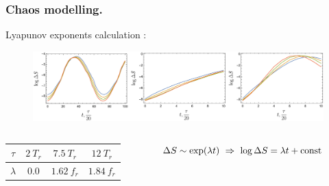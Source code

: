 \begin{frame}
    \frametitle{Chaos modelling.}
    Lyapunov exponents calculation :
    
\begin{figure}[h]
    \includegraphics[width=1.0\textwidth]{figures/lyapunovs.pdf}
\end{figure}



\begin{columns}
    \begin{column}{0.4\linewidth}
        \begin{tabular}{c|c|c|c}
        $\tau$ & $2 \ T_r$ & $7.5 \ T_r$ & $12 \ T_r$   \\ \hline
        $\lambda$ & $0.0$ & $1.62 \ f_r$ & $1.84 \ f_r$
        \end{tabular}   
    \end{column}
    \begin{column}{0.6\linewidth}
        $\Delta S \sim \exp(\lambda t) \ \Rightarrow \ \log \Delta S = \lambda t + \const$\\[5pt]
    \end{column}
\end{columns}   

\phantom{42}


\end{frame} 
